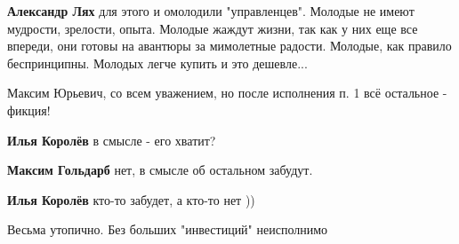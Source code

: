 \begin{itemize}
\begin{itemize}
\textbf{Александр Лях} для этого и омолодили "управленцев".
Молодые не имеют мудрости, зрелости, опыта. Молодые жаждут жизни, так как у них еще все впереди, они готовы на авантюры за мимолетные радости. Молодые, как правило беспринципны. Молодых легче купить и это дешевле...
\end{itemize}


Максим Юрьевич, со всем уважением, но после исполнения п. 1 всё остальное -
фикция!

\begin{itemize}
 
\textbf{Илья Королёв} в смысле - его хватит?

 
\textbf{Максим Гольдарб} нет, в смысле об остальном забудут.

 
\textbf{Илья Королёв} кто-то забудет, а кто-то нет ))
\end{itemize}

 
Весьма утопично. Без больших "инвестиций" неисполнимо

\begin{itemize}
 

\end{itemize}
\end{itemize}

